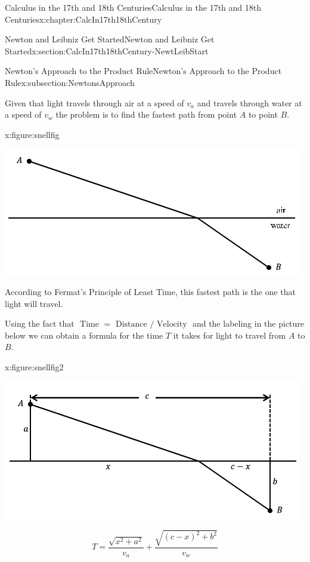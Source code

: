 \begin{chapterptx}{Calculus in the 17th and 18th Centuries}{}{Calculus in the 17th and 18th Centuries}{}{}{x:chapter:CalcIn17th18thCentury}
\begin{sectionptx}{Newton and Leibniz Get Started}{}{Newton and Leibniz Get Started}{}{}{x:section:CalcIn17th18thCentury-NewtLeibStart}
\begin{subsectionptx}{Newton's Approach to the Product Rule}{}{Newton's Approach to the Product Rule}{}{}{x:subsection:NewtonsApproach}
			\par
			Given that light travels through air at a speed of \(v_a\) and travels through water at a speed of \(v_w\) the problem is to find the fastest path from point \(A\) to point \(B\).%
			\begin{figureptx}{}{x:figure:snellfig}{}%
				\begin{image}{0.125}{0.75}{0.125}%
					\includegraphics[width=\linewidth]{external/images/snellfig.png}
				\end{image}%
				\tcblower
			\end{figureptx}%
			According to Fermat's Principle of Least Time, this fastest path is the one that light will travel.%
			\par
			Using the fact that \(\text{ Time } =\text{ Distance }
			/\text{ Velocity }\) and the labeling in the picture below we can obtain a formula for the time \(T\) it takes for light to travel from \(A\) to \(B\).%
			\begin{figureptx}{}{x:figure:snellfig2}{}%
				\begin{image}{0.125}{0.75}{0.125}%
					\includegraphics[width=\linewidth]{external/images/snellfig2.png}
				\end{image}%
				\tcblower
			\end{figureptx}%
			\begin{equation*}
				T=\frac{\sqrt{x^2+a^2}}{v_a}+\frac{\sqrt{(c-x)^2+b^2}}{v_w}

\end{equation*}
\end{subsectionptx}
\end{sectionptx}
\end{chapterptx}
